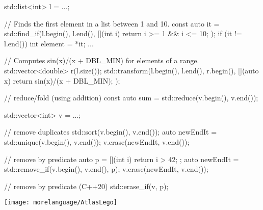 \begin{frame}[fragile]
  \begin{cppcode}
    std::list<int> l = ...;

    // Finds the first element in a list between 1 and 10.
    const auto it = std::find_if(l.begin(), l.end(),
        [](int i) { return i >= 1 && i <= 10; });
    if (it != l.end()) {
      int element = *it; ...
    }

    // Computes sin(x)/(x + DBL_MIN) for elements of a range.
    std::vector<double> r(l.size());
    std::transform(l.begin(), l.end(), r.begin(),
      [](auto x) { return sin(x)/(x + DBL_MIN); });

    // reduce/fold (using addition)
    const auto sum = std::reduce(v.begin(), v.end());
  \end{cppcode}
\end{frame}

\begin{frame}[fragile]
  \begin{cppcode}
    std::vector<int> v = ...;

    // remove duplicates
    std::sort(v.begin(), v.end());
    auto newEndIt = std::unique(v.begin(), v.end());
    v.erase(newEndIt, v.end());

    // remove by predicate
    auto p = [](int i) { return i > 42; };
    auto newEndIt = std::remove_if(v.begin(), v.end(), p);
    v.erase(newEndIt, v.end());

    // remove by predicate (C++20)
    std::erase_if(v, p);
  \end{cppcode}
\end{frame}

\begin{frame}[fragile]
  \begin{block}{}
    \texttt{[image: morelanguage/AtlasLego]}
  \end{block}
\end{frame}

